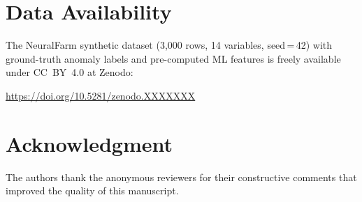 \documentclass[journal,10pt,twocolumn]{IEEEtran}
\begin{document}
\section*{Data Availability}

The NeuralFarm synthetic dataset (3{,}000 rows, 14 variables,
seed\,=\,42) with ground-truth anomaly labels and pre-computed ML
features is freely available under CC~BY~4.0 at Zenodo:
\begin{center}
  \footnotesize\url{https://doi.org/10.5281/zenodo.XXXXXXX}
\end{center}

\section*{Acknowledgment}

The authors thank the anonymous reviewers for their constructive
comments that improved the quality of this manuscript.

\balance   %
\end{document}
